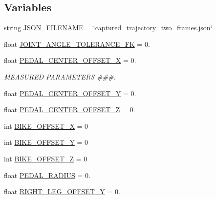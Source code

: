 \subsection*{Variables}
\begin{DoxyCompactItemize}
\item 
string \mbox{\hyperlink{namespacecapture__pedal__trajectory__two__frames_a5a40e049a2d082870751ae19b50f533e}{J\+S\+O\+N\+\_\+\+F\+I\+L\+E\+N\+A\+ME}} = \char`\"{}captured\+\_\+trajectory\+\_\+two\+\_\+frames.\+json\char`\"{}
\item 
float \mbox{\hyperlink{namespacecapture__pedal__trajectory__two__frames_a5aca36c6c50b7f5d462e8b6a2ed72b30}{J\+O\+I\+N\+T\+\_\+\+A\+N\+G\+L\+E\+\_\+\+T\+O\+L\+E\+R\+A\+N\+C\+E\+\_\+\+FK}} = 0.
\item 
float \mbox{\hyperlink{namespacecapture__pedal__trajectory__two__frames_a1f0bf28dedd3981b0931acbbf494c03d}{P\+E\+D\+A\+L\+\_\+\+C\+E\+N\+T\+E\+R\+\_\+\+O\+F\+F\+S\+E\+T\+\_\+X}} = 0.
\begin{DoxyCompactList}\small\item\em M\+E\+A\+S\+U\+R\+ED P\+A\+R\+A\+M\+E\+T\+E\+RS \#\#\#. \end{DoxyCompactList}\item 
float \mbox{\hyperlink{namespacecapture__pedal__trajectory__two__frames_abcfc091eca6611e897f6c200221c8901}{P\+E\+D\+A\+L\+\_\+\+C\+E\+N\+T\+E\+R\+\_\+\+O\+F\+F\+S\+E\+T\+\_\+Y}} = 0.
\item 
float \mbox{\hyperlink{namespacecapture__pedal__trajectory__two__frames_ab2cce5941cea28f4ef0e92cb0bb7710c}{P\+E\+D\+A\+L\+\_\+\+C\+E\+N\+T\+E\+R\+\_\+\+O\+F\+F\+S\+E\+T\+\_\+Z}} = 0.
\item 
int \mbox{\hyperlink{namespacecapture__pedal__trajectory__two__frames_aadb474d0620a888754c31c60d0c1868b}{B\+I\+K\+E\+\_\+\+O\+F\+F\+S\+E\+T\+\_\+X}} = 0
\item 
int \mbox{\hyperlink{namespacecapture__pedal__trajectory__two__frames_a71d7303f96aa3759391c3f4d2c857815}{B\+I\+K\+E\+\_\+\+O\+F\+F\+S\+E\+T\+\_\+Y}} = 0
\item 
int \mbox{\hyperlink{namespacecapture__pedal__trajectory__two__frames_a94b79f15a11897033243e9e4e59c0eb7}{B\+I\+K\+E\+\_\+\+O\+F\+F\+S\+E\+T\+\_\+Z}} = 0
\item 
float \mbox{\hyperlink{namespacecapture__pedal__trajectory__two__frames_a35124b08f095b710f2d653a7bae9f22c}{P\+E\+D\+A\+L\+\_\+\+R\+A\+D\+I\+US}} = 0.
\item 
float \mbox{\hyperlink{namespacecapture__pedal__trajectory__two__frames_ae6db910424eb5fba36fc05c7e1de96b3}{R\+I\+G\+H\+T\+\_\+\+L\+E\+G\+\_\+\+O\+F\+F\+S\+E\+T\+\_\+Y}} = 0.

\end{DoxyCompactItemize}
